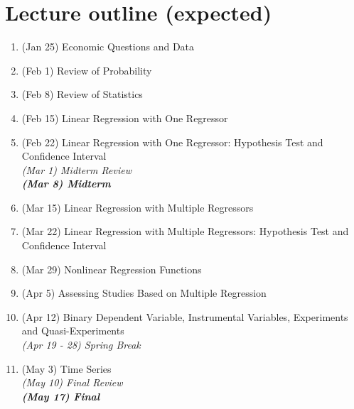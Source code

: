 \documentclass[12]{article}
\begin{document}
\newpage
\section*{Lecture outline (expected)}
\begin{enumerate}
    \item (Jan 25) Economic Questions and Data
    \item (Feb 1) Review of Probability
    \item (Feb 8) Review of Statistics
    \item (Feb 15) Linear Regression with One Regressor
    \item (Feb 22) Linear Regression with One Regressor: Hypothesis Test and Confidence Interval \\
    
    \newline
    \textit{(Mar 1) Midterm Review \\
    \textbf{(Mar 8) Midterm}} \\
    
    \item (Mar 15) Linear Regression with Multiple Regressors
    \item (Mar 22) Linear Regression with Multiple Regressors: Hypothesis Test and Confidence Interval
    \item (Mar 29) Nonlinear Regression Functions
    \item (Apr 5) Assessing Studies Based on Multiple Regression
    \item (Apr 12) Binary Dependent Variable, Instrumental Variables, Experiments and Quasi-Experiments \\
    
    \newline
    \textit{(Apr 19 - 28) Spring Break}\\
    
    \item (May 3) Time Series \\
    
    \newline
    \textit{(May 10) Final Review \\
    \textbf{(May 17) Final}} \\

\end{enumerate}
\end{document}
